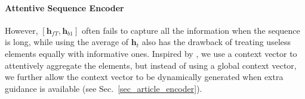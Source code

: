 


\paragraph{Attentive Sequence Encoder}
\label{sec_att_seq_encoder}
However, $[\mathbf{h}_{fT}, \mathbf{h}_{b1}]$ often fails to capture all the %
information when the sequence is long, while using the average of $\mathbf{h}_t$ also has the drawback of treating useless elements equally with informative ones. 
%
Inspired by \cite{yang2016hierarchical}, we use a context vector to attentively aggregate the elements, but instead of using a global context vector, we further allow the context vector to be dynamically generated when extra guidance is available (see Sec.~\ref{sec_article_encoder}).


